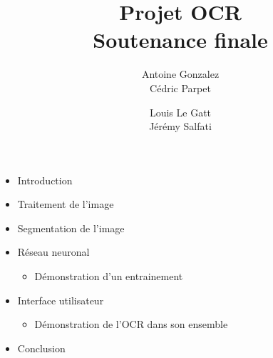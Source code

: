 \documentclass[14pt]{extarticle}
\title{
	{\Huge Projet OCR}\\
	\vspace{2em}
	{Soutenance finale}\\
}
\author{
	Antoine Gonzalez\\
	Cédric Parpet
	\and
	Louis Le Gatt\\
	Jérémy Salfati}
\begin{document}
\maketitle
\vspace{1em}

\begin{itemize}
	\item Introduction
	\item Traitement de l'image
	\item Segmentation de l'image
	\item Réseau neuronal
	\begin{itemize}
        	\item Démonstration d'un entrainement
	\end{itemize}
        \item Interface utilisateur
        \begin{itemize}
        	\item Démonstration de l'OCR dans son ensemble
	\end{itemize}
        \item Conclusion
\end{itemize}
\end{document}

